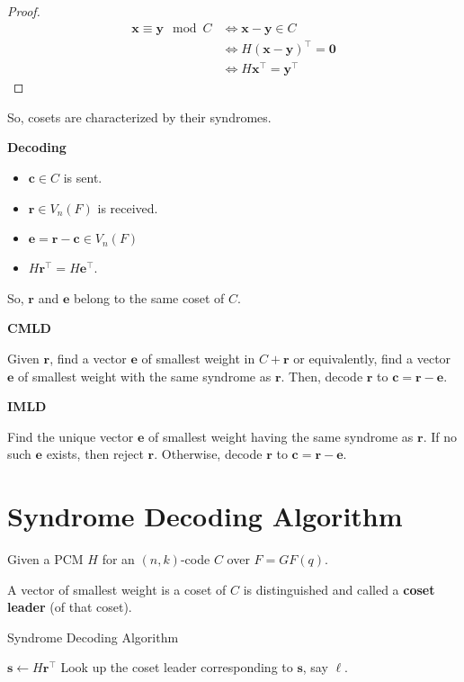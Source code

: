 \begin{proof}
    \begin{align*}
        \bm{x}\equiv \bm{y}\mod C
         & \iff \bm{x}-\bm{y}\in C           \\
         & \iff H(\bm{x}-\bm{y})^\top=\bm{0} \\
         & \iff H\bm{x}^\top=\bm{y}^\top
    \end{align*}
\end{proof}
So, cosets are characterized by their syndromes.

\textbf{Decoding}
\begin{itemize}
    \item $ \bm{c}\in C $ is sent.
    \item $ \bm{r}\in V_n(F) $ is received.
    \item $ \bm{e}=\bm{r}-\bm{c}\in V_n(F) $
    \item $ H\bm{r}^\top=H\bm{e}^\top $.
\end{itemize}
So, $ \bm{r} $ and $ \bm{e} $ belong to the same coset of $ C $.

\textbf{CMLD}

Given $ \bm{r} $, find a vector $ \bm{e} $ of smallest weight in $ C+\bm{r} $
or equivalently, find a vector $ \bm{e} $ of smallest weight with the same
syndrome as $ \bm{r} $. Then, decode $ \bm{r} $ to $ \bm{c}=\bm{r}-\bm{e} $.

\textbf{IMLD}

Find the unique vector $ \bm{e} $ of smallest weight having the same syndrome
as $ \bm{r} $. If no such $ \bm{e} $ exists, then reject $ \bm{r} $.
Otherwise, decode $ \bm{r} $ to $ \bm{c}=\bm{r}-\bm{e} $.

\section{Syndrome Decoding Algorithm}
Given a PCM $ H $ for an $ (n,k) $-code $ C $ over $ F=GF(q) $.

\begin{defbox}
    \begin{definition}
        A vector of smallest weight is a coset of $ C $ is distinguished and called
        a \textbf{coset leader} (of that coset).
    \end{definition}
\end{defbox}

\begin{algbox}
    \begin{algorithm}[H]
        \DontPrintSemicolon
        \caption{Syndrome Decoding Algorithm}

        $ \bm{s}\gets H\bm{r}^\top $\;
        Look up the coset leader corresponding to $ \bm{s} $, say $ \bm{\ell} $.\;
    \end{algorithm}
\end{algbox}

